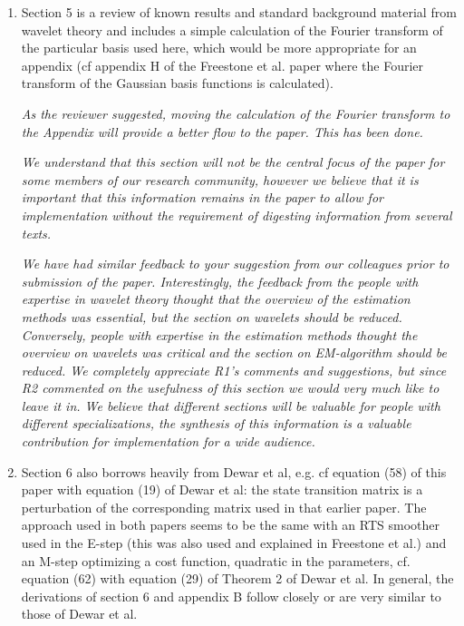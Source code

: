 \documentclass{article}
\newcommand{\parham}[1]{\textcolor{blue}{#1}}
\begin{document}
\begin{enumerate}
        \item Section 5 is a review of known results and standard background material from wavelet theory and includes a simple calculation of the Fourier transform of the particular basis used here, which would be more appropriate for an appendix (cf appendix H of the Freestone et al. paper where the Fourier transform of the Gaussian basis functions is calculated).


\emph{As the reviewer suggested, moving the calculation of the Fourier transform to the Appendix will provide a better flow to the paper. This has been done.}

\emph{We understand that this section will not be the central focus of the paper for some members of our research community, however we believe that it is important that this information remains in the paper to allow for implementation without the requirement of digesting information from several texts.} 

\emph{We have had similar feedback to your suggestion from our colleagues prior to submission of the paper. Interestingly, the feedback from the people with expertise in wavelet theory thought that the overview of the estimation methods was essential, but the section on wavelets should be reduced. Conversely, people with expertise in the estimation methods thought the overview on wavelets was critical and the section on EM-algorithm should be reduced. We completely appreciate R1's comments and suggestions, but since R2 commented on the usefulness of this section we would very much like to leave it in. We believe that different sections will be valuable for people with different specializations, the synthesis of this information is a valuable contribution for implementation for a wide audience.}

        \item Section 6 also borrows heavily from Dewar et al, e.g. cf equation (58) of this paper with equation (19) of Dewar et al: the state transition matrix is a perturbation of the corresponding matrix used in that earlier paper. The approach used in both papers seems to be the same with an RTS smoother used in the E-step (this was also used and explained in Freestone et al.) and an M-step optimizing a cost function, quadratic in the parameters, cf. equation (62) with equation (29) of Theorem 2 of Dewar et al. In general, the derivations of section 6 and appendix B follow closely or are very similar to those of Dewar et al.


\end{enumerate}
\end{document}
